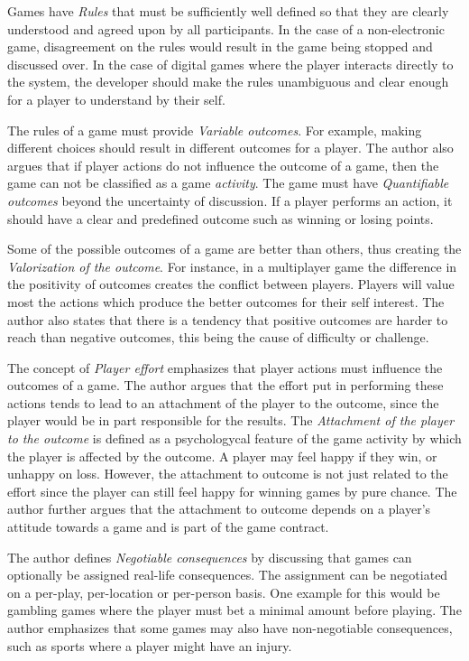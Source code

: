 Games have \emph{Rules} that must be sufficiently well defined so that they are clearly understood and agreed upon by all participants. In the case of a non-electronic game, disagreement on the rules would result in the game being stopped and discussed over. In the case of digital games where the player interacts directly to the system, the developer should make the rules unambiguous and clear enough for a player to understand by their self.

The rules of a game must provide \emph{Variable outcomes}. For example, making different choices should result in different outcomes for a player. The author also argues that if player actions do not influence the outcome of a game, then the game can not be classified as a game \emph{activity}. The game must have \emph{Quantifiable outcomes} beyond the uncertainty of discussion. If a player performs an action, it should have a clear and predefined outcome such as winning or losing points.

Some of the possible outcomes of a game are better than others, thus creating the \emph{Valorization of the outcome}. For instance, in a multiplayer game the difference in the positivity of outcomes creates the conflict between players. Players will value most the actions which produce the better outcomes for their self interest. The author also states that there is a tendency that positive outcomes are harder to reach than negative outcomes, this being the cause of difficulty or challenge. 

The concept of \emph{Player effort} emphasizes that player actions must influence the outcomes of a game. The author argues that the effort put in performing these actions tends to lead to an attachment of the player to the outcome, since the player would be in part responsible for the results. The \emph{Attachment of the player to the outcome} is defined as a psychologycal feature of the game activity by which the player is affected by the outcome. A player may feel happy if they win, or unhappy on loss. However, the attachment to outcome is not just related to the effort since the player can still feel happy for winning games by pure chance. The author further argues that the attachment to outcome depends on a player's attitude towards a game and is part of the game contract.

The author defines \emph{Negotiable consequences} by discussing that games can optionally be assigned real-life consequences. The assignment can be negotiated on a per-play, per-location or per-person basis. One example for this would be gambling games where the player must bet a minimal amount before playing. The author emphasizes that some games may also have non-negotiable consequences, such as sports where a player might have an injury.

